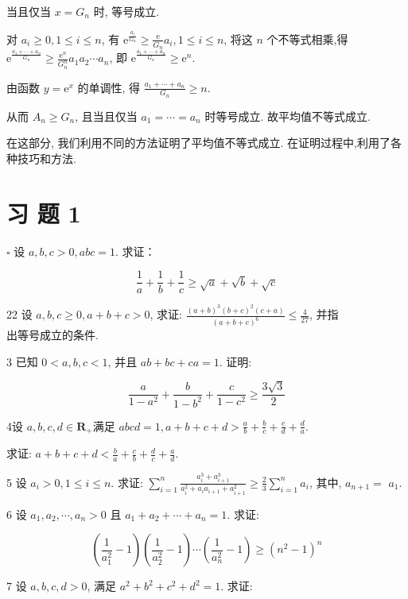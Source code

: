 当且仅当 $x=G_{n}$ 时, 等号成立.

对 $a_{i} \geqslant 0,1 \leqslant i \leqslant n$, 有 $\mathrm{e}^{\frac{a_{i}}{G_{n}}} \geqslant \frac{\mathrm{e}}{G_{n}} a_{i}, 1 \leqslant i \leqslant n$, 将这 $n$ 个不等式相乘,得 $\mathrm{e}^{\frac{a_{1}+\cdots+a_{n}}{G_{n}}} \geqslant \frac{\mathrm{e}^{n}}{G_{n}^{n}} a_{1} a_{2} \cdots a_{n}$, 即 $\mathrm{e}^{\frac{a_{1}+\cdots+a_{n}}{G_{n}}} \geqslant \mathrm{e}^{n}$.

由函数 $y=\mathrm{e}^{x}$ 的单调性, 得 $\frac{a_{1}+\cdots+a_{n}}{G_{n}} \geqslant n$.

从而 $A_{n} \geqslant G_{n}$, 且当且仅当 $a_{1}=\cdots=a_{n}$ 时等号成立. 故平均值不等式成立.

在这部分, 我们利用不同的方法证明了平均值不等式成立. 在证明过程中,利用了各种技巧和方法.

\section*{习 题 1}
$\square$ 设 $a, b, c>0, a b c=1$. 求证：

$$
\frac{1}{a}+\frac{1}{b}+\frac{1}{c} \geqslant \sqrt{a}+\sqrt{b}+\sqrt{c}
$$

22 设 $a, b, c \geqslant 0, a+b+c>0$, 求证: $\frac{(a+b)^{3}(b+c)^{2}(c+a)}{(a+b+c)^{6}} \leqslant \frac{4}{27}$, 并指\\
出等号成立的条件.

3 已知 $0<a, b, c<1$, 并且 $a b+b c+c a=1$. 证明:

$$
\frac{a}{1-a^{2}}+\frac{b}{1-b^{2}}+\frac{c}{1-c^{2}} \geqslant \frac{3 \sqrt{3}}{2}
$$

4设 $a, b, c, d \in \mathbf{R}_{+}$满足 $a b c d=1, a+b+c+d>\frac{a}{b}+\frac{b}{c}+\frac{c}{d}+\frac{d}{a}$.

求证: $a+b+c+d<\frac{b}{a}+\frac{c}{b}+\frac{d}{c}+\frac{a}{d}$.

5 设 $a_{i}>0,1 \leqslant i \leqslant n$. 求证: $\sum_{i=1}^{n} \frac{a_{i}^{3}+a_{i+1}^{3}}{a_{i}^{2}+a_{i} a_{i+1}+a_{i+1}^{2}} \geqslant \frac{2}{3} \sum_{i=1}^{n} a_{i}$, 其中, $a_{n+1}=$ $a_{1}$.

6 设 $a_{1}, a_{2}, \cdots, a_{n}>0$ 且 $a_{1}+a_{2}+\cdots+a_{n}=1$. 求证:

$$
\left(\frac{1}{a_{1}^{2}}-1\right)\left(\frac{1}{a_{2}^{2}}-1\right) \cdots\left(\frac{1}{a_{n}^{2}}-1\right) \geqslant\left(n^{2}-1\right)^{n}
$$

7 设 $a, b, c, d>0$, 满足 $a^{2}+b^{2}+c^{2}+d^{2}=1$. 求证:

